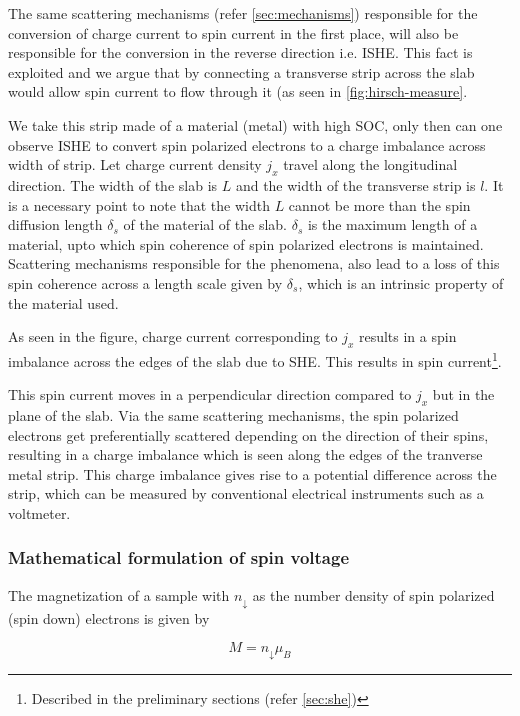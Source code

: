 The same scattering mechanisms (refer \cref{sec:mechanisms}) responsible for the conversion of charge current to spin current in the first place, will also be responsible for the conversion in the reverse direction i.e. ISHE.
This fact is exploited and we argue that by connecting a transverse strip across the slab would allow spin current to flow through it (as seen in \cref{fig:hirsch-measure}.

We take this strip made of a material (metal) with high SOC, only then can one observe ISHE to convert spin polarized electrons to a charge imbalance across width of strip.
Let charge current density \( j_x \) travel along the longitudinal direction.
The width of the slab is \( L \) and the width of the transverse strip is \( l \).
It is a necessary point to note that the width \( L \) cannot be more than the spin diffusion length \( \delta_s \) of the material of the slab.
\( \delta_s \) is the maximum length of a material, upto which spin coherence of spin polarized electrons is maintained.
Scattering mechanisms responsible for the phenomena, also lead to a loss of this spin coherence across a length scale given by \( \delta_s \), which is an intrinsic property of the material used.

As seen in the figure, charge current corresponding to \( j_x \) results in a spin imbalance across the edges of the slab due to SHE.
This results in spin current\footnote{Described in the preliminary sections (refer \cref{sec:she})}.

This spin current moves in a perpendicular direction compared to \( j_x \) but in the plane of the slab.
Via the same scattering mechanisms, the spin polarized electrons get preferentially scattered depending on the direction of their spins, resulting in a charge imbalance which is seen along the edges of the tranverse metal strip.
This charge imbalance gives rise to a potential difference across the strip, which can be measured by conventional electrical instruments such as a voltmeter.

\subsubsection{Mathematical formulation of spin voltage}

The magnetization of a sample with \( n_{\downarrow} \) as the number density of spin polarized (spin down) electrons is given by

\begin{equation}
    M = n_{\downarrow} \mu_B
\end{equation}

